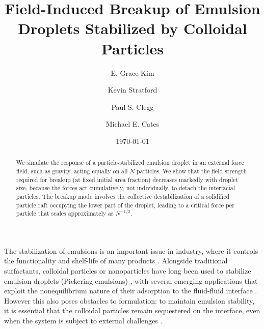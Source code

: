 \documentclass[aps,prl,superscriptaddress,twocolumn,showpacs,floatfix]{revtex4-1}
\begin{document}
\title{Field-Induced Breakup of Emulsion Droplets Stabilized by Colloidal Particles}

\author{E. Grace Kim}
\author{Kevin Stratford}
\author{Paul S. Clegg} \author{Michael E. Cates}



 \date{\today}
 \begin{abstract}
 We simulate the response of a particle-stabilized emulsion droplet in an external force field, such as gravity, acting equally on all $N$ particles.  We show that the field strength required for breakup (at fixed initial area fraction) decreases markedly with droplet size, because the forces act cumulatively, not individually, to detach the interfacial particles. The breakup mode involves the collective destabilization of a solidified particle raft occupying the lower part of the droplet, leading to a critical force per particle that scales approximately as $N^{-1/2}$.
 \end{abstract}
 \maketitle


The stabilization of emulsions is an important issue in industry, where it controls the functionality and shelf-life of many products \cite{miller:2008/a}. Alongside traditional surfactants, colloidal particles or nanoparticles have long been used to stabilize emulsion droplets (Pickering emulsions) \cite{pickering:1907/a}, with several emerging applications that exploit the nonequilibrium nature of their adsorption to the fluid-fluid interface \cite{Leal,binksnat,lin}. However this also poses obstacles to formulation: to maintain emulsion stability, it is essential that the colloidal particles remain sequestered on the interface, even when the system is subject to external challenges \cite{Aveyard,Leal}. 
\end{document}
